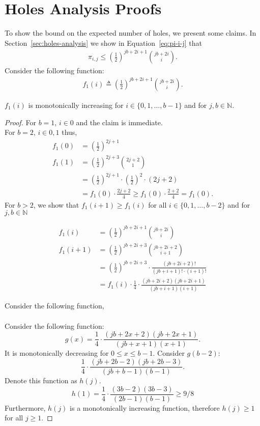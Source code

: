 \chapter{Holes Analysis Proofs}
\label{appendix:holes-pi-mono}

To show the bound on the expected number of holes, we present some claims. 
In Section~\ref{sec:holes-analysis} we show in Equation~\ref{eq:pi-i-j} that 
\begin{align*}
\pi_{i,j} \leq \left(\frac{1}{2}\right)^{jb + 2i +1} {{jb+2i} \choose i}.
\end{align*}
Consider the following function:
\begin{align*}
f_1(i) \triangleq \left(\frac{1}{2}\right)^{jb + 2i +1} {{jb+2i} \choose i}.
\end{align*}

\begin{claim}\label{claim:holes-f-1}
$f_1(i)$ is monotonically increasing for $i \in \{0,1,\dots,b-1\}$ and for $j,b \in \mathds{N}$. 
\end{claim}

\begin{proof}
For $b=1$, $i \in {0}$ and the claim is immediate.\\
For $b=2$, $i \in {0,1}$ thus,
\begin{align*}
    f_1(0) &= \left(\frac{1}{2}\right)^{2j+1} \\
    f_1(1) &= \left(\frac{1}{2}\right)^{2j+3} {{2j+2} \choose 1} \\
            &= \left(\frac{1}{2}\right)^{2j+1} \cdot \left(\frac{1}{2}\right)^{2} \cdot (2j+2)\\
            &= f_1(0) \cdot \frac{2j+2}{4} \geq f_1(0) \cdot \frac{2+2}{4} = f_1(0).
\end{align*}
For $b>2$, we show that $f_1(i+1)\geq f_1(i)$ for all $i \in \{0,1,\dots,b-2\}$ and for $j,b \in \mathds{N}$

\begin{align*}
    f_1(i) &= \left(\frac{1}{2}\right)^{jb + 2i +1} {{jb+2i} \choose {i}} \\
    f_1(i+1) &= \left(\frac{1}{2}\right)^{jb + 2i +3} {{jb+2i+2} \choose {i+1}} \\
    &= \left(\frac{1}{2}\right)^{jb + 2i +3} \cdot \frac{(jb+2i+2)!}{(jb+i+1)!\cdot(i+1)!} \\
    &= f_1(i) \cdot \frac{1}{4} \cdot \frac{(jb+2i+2)(jb+2i+1)}{(jb+i+1)(i+1)}
\end{align*}

Consider the following function, 
\begin{align}
    
\end{align}


Consider the following function:
\[g(x) = \frac{1}{4} \cdot \frac{(jb+2x+2)(jb+2x+1)}{(jb+x+1)(x+1)}.\]
It is monotonically decreasing for $0 \leq x \leq b-1$. Consider $g(b-2)$:
\[\frac{1}{4} \cdot \frac{(jb+2b-2)(jb+2b-3)}{(jb+b-1)(b-1)}.\]
Denote this function as $h(j)$.
\[h(1) = \frac{1}{4} \cdot \frac{(3b-2)(3b-3)}{(2b-1)(b-1)} \geq 9/8\]
Furthermore, $h(j)$ is a monotonically increasing function, therefore $h(j) \geq 1$ for all $j \geq 1$.

\end{proof}
